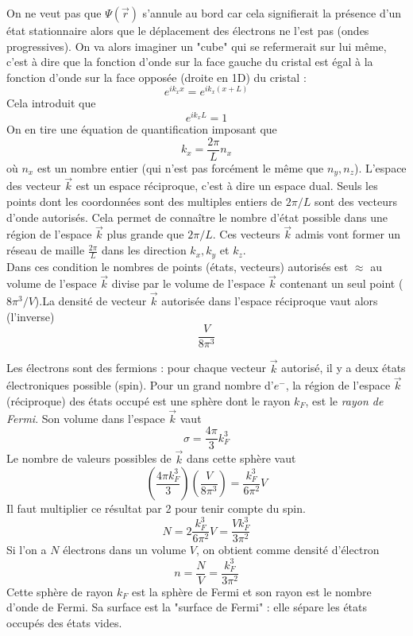 On ne veut pas que $\Psi(\vec{r})$ s'annule au bord car cela 
signifierait la présence d'un état stationnaire alors que le déplacement 
des électrons ne l'est pas (ondes progressives). On va alors imaginer 
un "cube" qui se refermerait sur lui même, c'est à dire que la fonction 
d'onde sur la face gauche du cristal est égal à la 
fonction d'onde sur la face opposée (droite en 1D) du cristal :
\begin{equation}
	e^{ik_xx} = e^{ik_x(x+L)}
\end{equation}
Cela introduit que 
\begin{equation}
	e^{ik_xL} = 1
\end{equation}
On en tire une équation de quantification imposant que
\begin{equation}
	k_x = \frac{2\pi}{L}n_x
\end{equation}
où $n_x$ est un nombre entier (qui n'est pas forcément le même 
que $n_y, n_z$). L'espace des vecteur $\vec{k}$ est un espace 
réciproque, c'est à dire un espace dual. Seuls les points dont les 
coordonnées sont des multiples entiers de $2\pi/L$ sont des vecteurs 
d'onde autorisés. Cela permet de connaître le nombre d'état possible 
dans une région de l'espace $\vec{k}$ plus grande que $2\pi/L$. 
Ces vecteurs $\vec k$ admis vont former un réseau de maille
$\frac{2\pi}{L}$ dans les direction $k_x,k_y$ et $k_z$.\\

Dans ces condition le nombres de points (états, vecteurs) autorisés 
est $\approx$ au volume de l'espace $\vec{k}$ divise par le volume 
de l'espace $\vec{k}$ contenant un seul point ($8\pi^3/V$).La densité 
de vecteur $\vec{k}$ autorisée dans l'espace réciproque vaut alors 
(l'inverse) 
\begin{equation}
	\frac{V}{8\pi^3}
\end{equation}

Les électrons sont des fermions : pour chaque vecteur $\vec k$ 
autorisé, il y a deux états électroniques possible (spin). Pour un 
grand nombre d'$e^-$, la région de l'espace $\vec{k}$ (réciproque) 
des états occupé est une sphère dont le rayon $k_F$, est le \textit{
	rayon de Fermi}. Son volume dans l'espace $\vec{k}$ vaut
\begin{equation}
	\sigma = \frac{4\pi}{3}k_F^3
\end{equation}
Le nombre de valeurs possibles de $\vec{k}$ dans cette sphère vaut 
\begin{equation}
	\left(\frac{4\pi k_F^3}{3}\right)\left(\frac{V}{8\pi^3}\right) = 
	\frac{k_F^3}{6\pi^2}V
\end{equation}
Il faut multiplier ce résultat par 2 pour tenir compte du spin.
\begin{equation}
	N = 2\frac{k_F^3}{6\pi^2}V = \frac{Vk_F^3}{3\pi^2}
\end{equation}
Si l'on a $N$ électrons dans un volume $V$, on obtient comme 
densité d'électron
\begin{equation}
	n = \frac{N}{V} = \frac{k_F^3}{3\pi^2}
\end{equation}
Cette sphère de rayon $k_F$ est la sphère de Fermi et son rayon est 
le nombre d'onde de Fermi. Sa surface est la "surface de Fermi" : 
elle sépare les états occupés des états vides.\\

